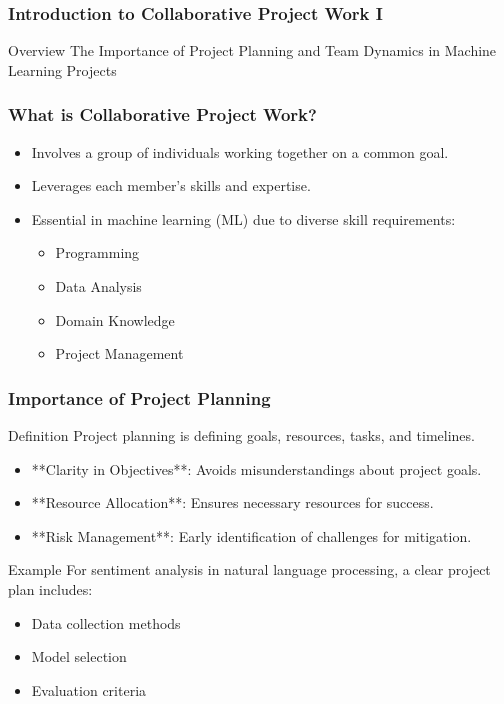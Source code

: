 \documentclass[aspectratio=169]{beamer}
\begin{document}
\frame{\titlepage}

\begin{frame}[fragile]
    \frametitle{Introduction to Collaborative Project Work I}
    
    \begin{block}{Overview}
        The Importance of Project Planning and Team Dynamics in Machine Learning Projects
    \end{block}
\end{frame}

\begin{frame}[fragile]
    \frametitle{What is Collaborative Project Work?}
    
    \begin{itemize}
        \item Involves a group of individuals working together on a common goal.
        \item Leverages each member’s skills and expertise.
        \item Essential in machine learning (ML) due to diverse skill requirements:
            \begin{itemize}
                \item Programming
                \item Data Analysis
                \item Domain Knowledge
                \item Project Management
            \end{itemize}
    \end{itemize}
\end{frame}

\begin{frame}[fragile]
    \frametitle{Importance of Project Planning}
    
    \begin{block}{Definition}
        Project planning is defining goals, resources, tasks, and timelines.
    \end{block}
    
    \begin{itemize}
        \item **Clarity in Objectives**: Avoids misunderstandings about project goals.
        \item **Resource Allocation**: Ensures necessary resources for success.
        \item **Risk Management**: Early identification of challenges for mitigation.
    \end{itemize}
    
    \begin{block}{Example}
        For sentiment analysis in natural language processing, a clear project plan includes:
        \begin{itemize}
            \item Data collection methods
            \item Model selection
            \item Evaluation criteria
        \end{itemize}
    \end{block}
\end{frame}
\end{document}
